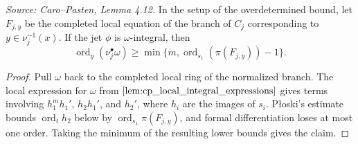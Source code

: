 \begin{lemma}
  \label{lem:cp_individual_branch_bound}
  \textit{Source: Caro--Pasten, Lemma 4.12.}
  In the setup of the overdetermined bound, let \(F_{j,y}\) be the completed
  local equation of the branch of \(C_j\) corresponding to
  \(y\in\nu_j^{-1}(x)\).  If the jet \(\phi\) is \(\omega\)-integral, then
  \[
    \operatorname{ord}_y(\nu_j^\bullet\omega)
    \ge \min\{m,\operatorname{ord}_{s_1}(\pi(F_{j,y}))-1\}.
  \]
\end{lemma}
\begin{proof}
  Pull \(\omega\) back to the completed local ring of the normalized branch.
  The local expression for \(\omega\) from
  \(\ref{lem:cp_local_integral_expressions}\) gives terms involving
  \(h_1^m h_1'\), \(h_2h_1'\), and \(h_2'\), where
  \(h_i\) are the images of \(s_i\).  Płoski's estimate bounds
  \(\operatorname{ord}_t h_2\) below by
  \(\operatorname{ord}_{s_1}\pi(F_{j,y})\), and formal differentiation loses
  at most one order.  Taking the minimum of the resulting lower bounds gives
  the claim.
\end{proof}

